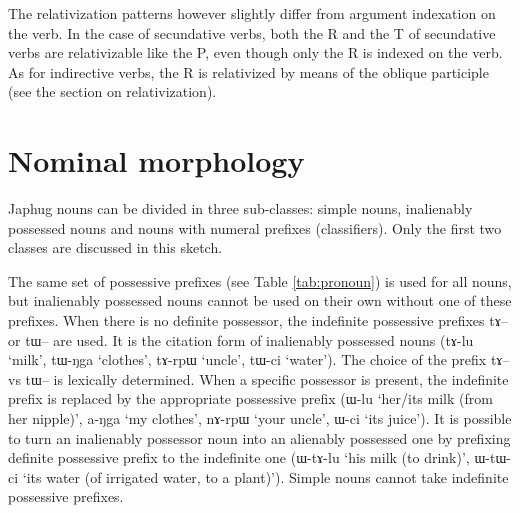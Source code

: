 \documentclass[oldfontcommands,oneside,a4paper,11pt]{article}
\newcommand{\ipa}[1]{{\phon#1}} %
\begin{document}
The relativization patterns however slightly differ from argument indexation on the verb.
In the case of secundative verbs, both the R and the T of secundative verbs are relativizable like the P, even though only the R is indexed on the verb. As for indirective verbs, the R is relativized by means of the oblique participle (see the section on relativization).

\section{Nominal morphology}
Japhug nouns can be divided in three sub-classes: simple nouns, inalienably possessed nouns and nouns with numeral prefixes (classifiers). Only the first two classes are discussed in this sketch. 

The same set of possessive prefixes (see Table \ref{tab:pronoun}) is used for all nouns, but inalienably possessed nouns cannot be used on their own without one of these prefixes. When there is no definite possessor, the indefinite possessive prefixes \ipa{tɤ--} or \ipa{tɯ--} are used. It is the citation form of inalienably possessed nouns (\ipa{tɤ-lu} `milk', \ipa{tɯ-ŋga} `clothes', \ipa{tɤ-rpɯ} `uncle', \ipa{tɯ-ci} `water'). The choice of the prefix \ipa{tɤ--} vs \ipa{tɯ--} is lexically determined.  When a specific possessor is present, the indefinite prefix is replaced by the appropriate possessive prefix (\ipa{ɯ-lu} `her/its milk (from her nipple)', \ipa{a-ŋga} `my clothes', \ipa{nɤ-rpɯ} `your uncle', \ipa{ɯ-ci} `its juice'). It is possible to turn an inalienably possessor noun into an alienably possessed one by prefixing definite possessive prefix to the indefinite one (\ipa{ɯ-tɤ-lu} `his milk (to drink)', \ipa{ɯ-tɯ-ci} `its water (of irrigated water, to a plant)'). Simple nouns cannot take indefinite possessive prefixes.
\end{document}

